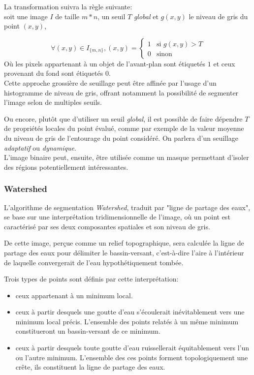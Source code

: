\documentclass[a4paper,11pt]{report}
\begin{document}
La transformation suivra la règle suivante:\\
soit une image $I$ de taille $m*n$, un seuil $T$ \textit{global} et $g(x,y)$ le niveau de gris du point $(x,y)$,

$$ \forall (x,y) \in I_{\{m,n\}}, (x,y) = \left\{ 
\begin{array}{rl}
1 &\mbox{si } g(x,y)>T\\
0 &\mbox{sinon}
\end{array} \right.
$$ 
Où les pixels appartenant à un objet de l'avant-plan sont étiquetés $1$ et ceux provenant du fond sont étiquetés $0$.\\ 

Cette approche grossière de seuillage peut être affinée par l'usage d'un histogramme de niveau de gris, offrant notamment la possibilité de segmenter l'image selon de multiples seuils.

Ou encore, plutôt que d'utiliser un seuil \textit{global}, il est possible de faire dépendre $T$ de propriétés locales du point évalué, comme par exemple de la valeur moyenne du niveau de gris de l'entourage du point considéré. On parlera d'un seuillage \textit{adaptatif} ou \textit{dynamique}.\\

L'image binaire peut, ensuite, être utilisée comme un masque permettant d'isoler des régions potentiellement intéressantes.

\subsubsection{Watershed}
L'algorithme de segmentation \textit{Watershed}, traduit par "ligne de partage des eaux", se base sur une interprétation tridimensionnelle de l'image, où un point est caractérisé par ses deux composantes spatiales et son niveau de gris.

De cette image, perçue comme un relief topographique, sera calculée la ligne de partage des eaux pour délimiter le bassin-versant, c'est-à-dire l'aire à l'intérieur de laquelle convergerait de l'eau hypothétiquement tombée. 

Trois types de points sont définis par cette interprétation:
\begin{itemize}
\item ceux appartenant à un minimum local.
\item ceux à partir desquels une goutte d'eau s'écoulerait inévitablement vers une minimum local précis. L'ensemble des points relatés à un même minimum constitueront un bassin-versant de ce minimum.
\item ceux à partir desquels toute goutte d'eau ruissellerait équitablement vers l'un ou l'autre minimum. L'ensemble des ces points forment topologiquement une crête, ils constituent la ligne de partage des eaux.\\
\end{itemize} 
 
\end{document}
